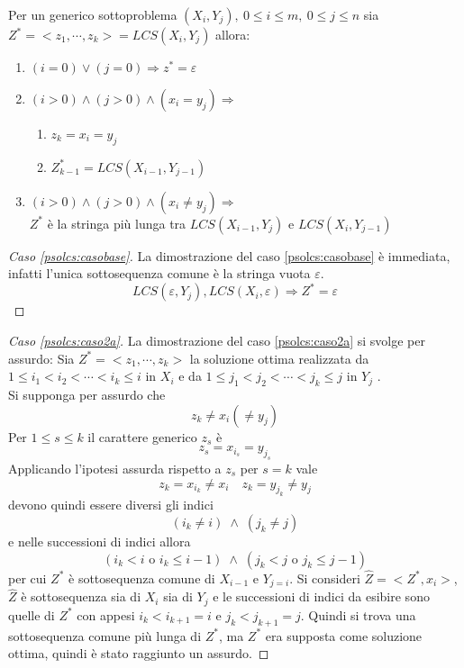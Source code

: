 \begin{lemma}
    Per un generico sottoproblema $\left( X_i, Y_j \right), \: 0 \leq i \leq m, \: 0 \leq j \leq n$ sia 
    $ Z^* = < z_1, \cdots, z_k > = LCS\left( X_i,Y_j \right)$ allora:
    \begin{enumerate}
        \item $(i=0) \vee (j=0) \Rightarrow z^* = \varepsilon$
            \label{psolcs:casobase}
        \item $(i>0) \wedge (j>0) \wedge (x_i = y_j) \Rightarrow $
            \begin{enumerate}
                \item $z_k = x_i = y_j$
                    \label{psolcs:caso2a}
                \item $Z_{k-1}^* = LCS(X_{i-1}, Y_{j-1})$
                    \label{psolcs:caso2b}
            \end{enumerate}
        \item $(i>0) \wedge (j>0) \wedge (x_i \neq y_j) \Rightarrow $
            \\
            $ Z^*$ è la stringa più lunga tra $LCS\left( X_{i-1}, Y_j \right)$ e $LCS\left( X_i, Y_{j-1} \right)$
            \label{psolcs:caso3}
    \end{enumerate}
    \label{lemma:psolcs}
\end{lemma}

\begin{proof}[Caso \ref{psolcs:casobase}]
    La dimostrazione del caso \ref{psolcs:casobase} è immediata, infatti l'unica sottosequenza comune è la stringa vuota $\varepsilon$.
    \[
        LCS(\varepsilon, Y_j), LCS(X_i, \varepsilon) \Rightarrow Z^*=\varepsilon 
    \]
\end{proof}

\begin{proof}[Caso \ref{psolcs:caso2a}]
    La dimostrazione del caso \ref{psolcs:caso2a} si svolge per assurdo:
    Sia 
    $ Z^* = < z_1, \cdots, z_k > $
    la soluzione ottima realizzata da 
    $1 \leq i_1 < i_2 < \cdots < i_k \leq i $ in $X_i$
    e da
    $1 \leq j_1 < j_2 < \cdots < j_k \leq j $ in $Y_j$
    .\\
    Si supponga per assurdo che
    \[
        z_k \neq x_i ( \neq y_j)
    \]
    Per $1 \leq s \leq k$ il carattere generico $z_s$ è
    \[
        z_s = x_{i_s} = y_{j_s}
    \]
    Applicando l'ipotesi assurda rispetto a  $z_s$ per $s=k$ vale
    \[
        z_k = x_{i_k} \neq x_i \quad z_k = y_{j_k} \neq y_j
    \]
    devono quindi essere diversi gli indici
    \[
        (i_k \neq i) \; \wedge \; (j_k \neq j)
    \]
    e nelle successioni di indici allora
    \[
        (i_k<i \text{ o } i_k \leq i-1) 
        \; \wedge \;
        (j_k<j \text{ o } j_k \leq j-1)
    \]
    per cui $Z^*$ è sottosequenza comune di $X_{i-1}$ e $Y_{j=i}$.
    Si consideri $\hat{Z} = < Z^* , x_i >$, $\hat{Z}$ è sottosequenza sia di $X_i$ sia di $Y_j$
    e le successioni di indici da esibire sono quelle di $Z^*$ con appesi $i_k < i_{k+1} = i$ e $j_k < j_{k+1} = j$.
    Quindi si trova una sottosequenza comune più lunga di $Z^*$, ma $Z^*$ era supposta come soluzione ottima, quindi è stato raggiunto un assurdo.
\end{proof}

